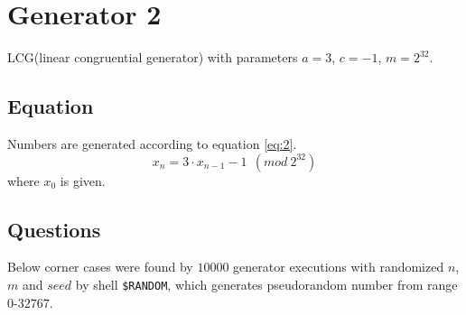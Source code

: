 \documentclass[a4paper,10pt]{article}
\begin{document}
\section{Generator 2}
LCG(linear congruential generator) with parameters $a=3$, $c=-1$, $m=2^{32}$.
\subsection{Equation}
Numbers are generated according to equation \ref{eq:2}.
\begin{equation}
\label{eq:2}
  x_n = 3 \cdot x_{n-1} - 1\ \ (mod\ 2^{32}) 
\end{equation}
where ${x_0}$ is given.

\subsection{Questions}
Below corner cases were found by $10000$ generator executions with randomized $n$, $m$ and $seed$ by shell \texttt{\$RANDOM}, which generates pseudorandom number from range $0$-$32767$.
\end{document}
